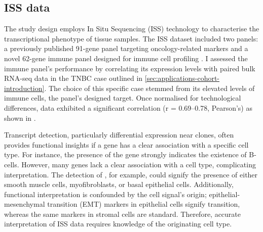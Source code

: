\subsection{\acl{ISS} data}
\label{sec:modalities-iss}


The study design employs In Situ Sequencing (\ac{ISS}) technology to characterise the transcriptional phenotype of tissue samples. The \ac{ISS} dataset included two panels: a previously published 91-gene panel targeting oncology-related markers and a novel 62-gene immune panel designed for immune cell profiling . I assessed the immune panel's performance by correlating its expression levels with paired bulk RNA-seq data in the \acf{TNBC} case outlined in \cref{sec:applications-cohort-introduction}. The choice of this specific case stemmed from its elevated levels of immune cells, the panel's designed target. Once normalised for technological differences, data exhibited a significant correlation (r = 0.69–0.78, Pearson's) as shown in .

Transcript detection, particularly differential expression near clones, often provides functional insights if a gene has a clear association with a specific cell type. For instance, the presence of the  gene strongly indicates the existence of B-cells. However, many genes lack a clear association with a cell type, complicating interpretation. The detection of , for example, could signify the presence of either smooth muscle cells, myofibroblasts, or basal epithelial cells. Additionally, functional interpretation is confounded by the cell signal's origin; epithelial-mesenchymal transition (EMT) markers in epithelial cells signify transition, whereas the same markers in stromal cells are standard. Therefore, accurate interpretation of \ac{ISS} data requires knowledge of the originating cell type.

